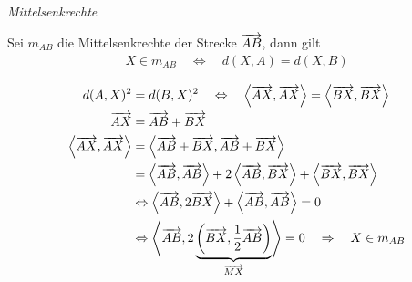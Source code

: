 \begin{mylemma}\textit{Mittelsenkrechte}\medskip

    \begin{minipage}{0.6\textwidth}
        Sei $m_{AB}$ die Mittelsenkrechte der Strecke $\overrightarrow{AB}$, dann gilt
        \begin{align*}
            X \in m_{AB} \quad \Leftrightarrow \quad d(X,A) = d(X,B)
        \end{align*}
    \end{minipage}
    \begin{minipage}{0.4\textwidth}
        \begin{center}
        \end{center}
    \end{minipage}
    \begin{align*}
        d(A,X)^2 & = d(B,X)^2 \quad \Leftrightarrow \quad \left\langle \overrightarrow{AX}, \overrightarrow{AX} \right\rangle = \left\langle \overrightarrow{BX}, \overrightarrow{BX} \right\rangle\\
        \overrightarrow{AX} & = \overrightarrow{AB} + \overrightarrow{BX}\\
        \left\langle \overrightarrow{AX}, \overrightarrow{AX} \right\rangle & = \left\langle \overrightarrow{AB} + \overrightarrow{BX}, \overrightarrow{AB} + \overrightarrow{BX} \right\rangle\\
        & = \left\langle \overrightarrow{AB}, \overrightarrow{AB} \right\rangle + 2 \left\langle \overrightarrow{AB}, \overrightarrow{BX} \right\rangle + \left\langle \overrightarrow{BX}, \overrightarrow{BX} \right\rangle\\
        & \Leftrightarrow \left\langle \overrightarrow{AB}, 2 \overrightarrow{BX} \right\rangle + \left\langle \overrightarrow{AB}, \overrightarrow{AB} \right\rangle = 0\\
        & \Leftrightarrow \left\langle \overrightarrow{AB}, 2 \underbrace{\left( \overrightarrow{BX}, \frac{1}{2} \overrightarrow{AB} \right)}_{\overrightarrow{MX}} \right\rangle = 0 \quad \Rightarrow \quad X \in m_{AB}
    \end{align*}
\end{mylemma}

